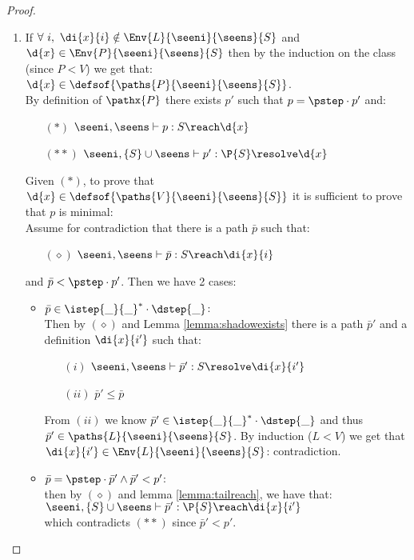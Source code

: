 \begin{proof}
\begin{enumerate}
\item If $\forall\ i,\ \di{x}{i} \notin \Env{L}{\seeni}{\seens}{S}$ and $\d{x} \in \Env{P}{\seeni}{\seens}{S}$ 
then by the induction on the class (since $P < V$) we get that:
 $\d{x} \in \defsof{\paths{P}{\seeni}{\seens}{S}}$.\\
By definition of $\pathx{P}$ there exists $p'$ such that $p = \pstep \cdot p'$ and:
\begin{itemize}[leftmargin=15mm]
 \item[$(*)$] $ \seeni,\seens \vdash p : S \reach \d{x}$
 \item[$(**)$] $ \seeni,\{S\} \cup \seens \vdash p' : \P{S} \resolve \d{x}$
\end{itemize}
Given $(*)$, to prove that $\d{x} \in \defsof{\paths{V}{\seeni}{\seens}{S}}$ it is sufficient to prove that $p$ is minimal:\\
Assume for contradiction that there is a path $\bar{p}$ such that:
\begin{itemize}[leftmargin=15mm]
 \item[$ (\diamond)$] $ \seeni,\seens \vdash \bar{p} : S \reach \di{x}{i}$
\end{itemize}
and $\bar{p} < \pstep \cdot p'$. 
Then we have 2 cases:
\begin{itemize}[leftmargin=10mm]
 \item $\bar{p} \in \istep{\_}{\_}^*\cdot \dstep{\_}$:\\
  Then by $ (\diamond)$ and Lemma \ref{lemma:shadowexists} there is a path $\bar{p}'$ and a definition $\di{x}{i'}$ such that:
  \begin{itemize}
   \item[$(i)$]  $ \seeni,\seens \vdash \bar{p}' : S \resolve \di{x}{i'}$ 
   \item[$(ii)$]$\bar{p}' \leq \bar{p}$
  \end{itemize}
  From $(ii)$ we know  $\bar{p}' \in \istep{\_}{\_}^*\cdot \dstep{\_}$ and thus $\bar{p}' \in \paths{L}{\seeni}{\seens}{S}$.
By induction ($L < V$) we get that $\di{x}{i'} \in \Env{L}{\seeni}{\seens}{S}$: contradiction.

 \item $\bar{p} = \pstep\cdot \bar{p}' \wedge \bar{p}' < p'$:\\
  then by $(\diamond)$ and lemma \ref{lemma:tailreach}, we have that:\\
  \tab $\seeni,\{S\} \cup \seens \vdash \bar{p}' : \P{S} \reach \di{x}{i'}$ \\
  which contradicts $(**)$ since $\bar{p}' < p'$.\medskip
\end{itemize}
\end{enumerate}


\end{proof}
